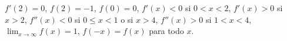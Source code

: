 \item $f'(2) = 0$, $f(2) = -1$, $f(0) = 0$, $f'(x) < 0$ si $0 < x < 2$, $f'(x) > 0$ si $x > 2$, $f''(x) < 0$ si $0 \le x < 1$ o si $x > 4$, $f''(x) > 0$ si $1 < x < 4$, $\lim_{x \to \infty} f(x) = 1$, $f(-x) = f(x)$ para todo $x$.
